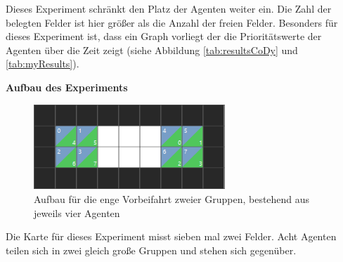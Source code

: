 Dieses Experiment schränkt den Platz der Agenten weiter ein. Die Zahl der belegten Felder ist hier größer als die Anzahl der freien Felder. Besonders für dieses Experiment ist, dass ein Graph vorliegt der die Prioritätswerte der Agenten über die Zeit zeigt (siehe Abbildung \ref{tab:resultsCoDy} und \ref{tab:myResults}). 

\textbf{Aufbau des Experiments}
\begin{figure}[H]
    \includegraphics[height=32mm]{images/4vs4_tight.png}
    \centering
    \caption{Aufbau für die enge Vorbeifahrt zweier Gruppen, bestehend aus jeweils vier Agenten}
    \label{fig:4x4}
\end{figure}
Die Karte für dieses Experiment misst sieben mal zwei Felder. Acht Agenten teilen sich in zwei gleich große Gruppen und stehen sich gegenüber.